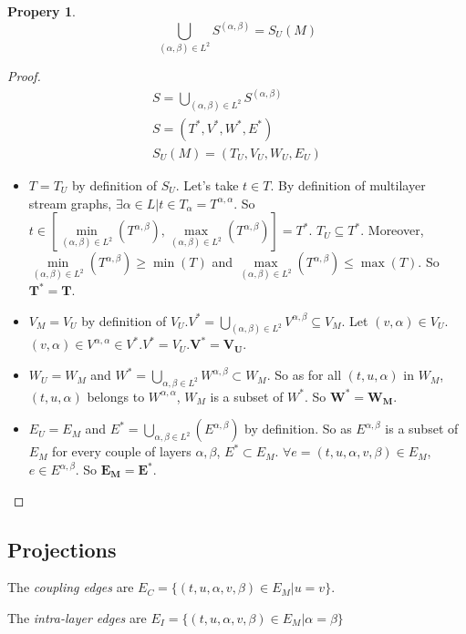 \documentclass[dvipsnames,a4paper,11pt]{article}
\newtheorem{prop}{Propery}
\theoremstyle{definition}
\theoremstyle{remark}
\theoremstyle{remark}
\begin{document}
		\begin{prop}
		\[
			\bigcup_{(\alpha,\beta) \in L^2} S^{(\alpha,\beta)} = S_U(M)
		\]
	\end{prop}
	\begin{proof}
		\begin{align*}
			S=\bigcup_{(\alpha,\beta) \in L^2} S^{(\alpha,\beta)}\\
			S=(T^{*},V^{*},W^{*},E^{*})\\
			S_U(M) = (T_U,V_U,W_U,E_U)			
		\end{align*}		 
	
	
	\begin{itemize}
		\item $T=T_U$ by definition of $S_U$. Let's take $t\in T$. By definition of multilayer stream graphs, $\exists \alpha \in L | t\in T_{\alpha}=T^{\alpha,\alpha}$. So $t \in [\underset{(\alpha,\beta) \in L^2}{\min}(T^{\alpha,\beta}),\underset{(\alpha,\beta) \in L^2}{\max}(T^{\alpha,\beta})]=T^{*}$. $T_U \subseteq T^{*}$. 
	Moreover, $\underset{(\alpha,\beta) \in L^2}{\min}(T^{\alpha,\beta}) \geq \min(T)$ 
	and $\underset{(\alpha,\beta) \in L^2}{\max}(T^{\alpha,\beta}) \leq \max(T)$. 
	So $\mathbf{T^{*} = T}$.
		\item  $V_M = V_U$ by definition of $V_U$.$V^{*}=\bigcup_{(\alpha,\beta) \in L^2} V^{\alpha,\beta} \subseteq V_M$.
	Let $(v,\alpha) \in V_U$. $(v,\alpha) \in V^{\alpha,\alpha} \in V^{*}$.$V^{*}=V_U$.$\mathbf{V^{*}=V_U}$.
		\item $W_U=W_M$ and $W^{*}=\bigcup_{\alpha,\beta \in L^2} W^{\alpha,\beta} \subset W_M$. So as for all $ (t,u,\alpha)$ in $W_M$, $(t,u,\alpha)$ belongs to $W^{\alpha,\alpha}$, $W_M$ is a subset of $W^{*}$. So $\mathbf{W^{*}=W_M}$.
		\item $E_U=E_M$ and $E^{*}=\bigcup_{\alpha,\beta \in L^2}(E^{\alpha,\beta})$ by definition. So as $E^{\alpha,\beta}$ is a subset of $E_M$ for every couple of layers $\alpha,\beta$, $E^{*} \subset E_M$. 
		$\forall e =(t,u,\alpha,v,\beta) \in E_M$, $e \in E^{\alpha,\beta}$. So $\mathbf{E_M=E^{*}}$.
	\end{itemize}		
	\end{proof}


	\subsection{Projections }

    The {\em coupling edges} are $E_C=\{(t,u,\alpha,v,\beta)\in E_M | u=v\}$.

    The {\em intra-layer edges} are $E_I = \{(t,u,\alpha,v,\beta) \in E_M | \alpha = \beta \}$
\end{document}
